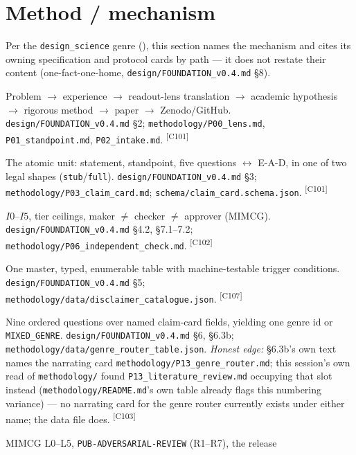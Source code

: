 \documentclass[11pt]{article}
\newcommand{\claimref}[1]{\textsuperscript{[#1]}}
\begin{document}
\section{Method / mechanism}
\label{sec:method}
Per the \texttt{design\_science} genre (), this section names the mechanism and
cites its owning specification and protocol cards by path --- it does not restate their content
(one-fact-one-home, \texttt{design/FOUNDATION\_v0.4.md} \S8).

\begin{description}[style=nextline,leftmargin=1.4em,font=\bfseries]
  \item[The spine (round trip)] Problem $\to$ experience $\to$ readout-lens translation $\to$
    academic hypothesis $\to$ rigorous method $\to$ paper $\to$ Zenodo/GitHub.
    \texttt{design/FOUNDATION\_v0.4.md} \S2; \texttt{methodology/P00\_lens.md},
    \texttt{P01\_standpoint.md}, \texttt{P02\_intake.md}. \claimref{C101}
  \item[The claim card] The atomic unit: statement, standpoint, five questions $\leftrightarrow$
    E-A-D, in one of two legal shapes (\texttt{stub}/\texttt{full}).
    \texttt{design/FOUNDATION\_v0.4.md} \S3; \texttt{methodology/P03\_claim\_card.md};
    \texttt{schema/claim\_card.schema.json}. \claimref{C101}
  \item[The Independence Ladder] $I0$--$I5$, tier ceilings, maker $\neq$ checker $\neq$ approver
    (MIMCG). \texttt{design/FOUNDATION\_v0.4.md} \S4.2, \S7.1--7.2;
    \texttt{methodology/P06\_independent\_check.md}. \claimref{C102}
  \item[The disclaimer catalogue] One master, typed, enumerable table with machine-testable
    trigger conditions. \texttt{design/FOUNDATION\_v0.4.md} \S5;
    \texttt{methodology/data/disclaimer\_catalogue.json}. \claimref{C107}
  \item[The genre router] Nine ordered questions over named claim-card fields, yielding one genre
    id or \texttt{MIXED\_GENRE}. \texttt{design/FOUNDATION\_v0.4.md} \S6, \S6.3b;
    \texttt{methodology/data/genre\_router\_table.json}. \emph{Honest edge:} \S6.3b's own text
    names the narrating card \texttt{methodology/P13\_genre\_router.md}; this session's own read of
    \texttt{methodology/} found \texttt{P13\_literature\_review.md} occupying that slot instead
    (\texttt{methodology/README.md}'s own table already flags this numbering variance) --- no
    narrating card for the genre router currently exists under either name; the data file does.
    \claimref{C103}
  \item[Gates and release] MIMCG L0--L5, \texttt{PUB-ADVERSARIAL-REVIEW} (R1--R7), the release

\end{description}
\end{document}
